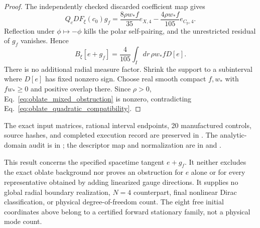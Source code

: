 \begin{proof}
The independently checked discarded coefficient map gives
\begin{equation}
 Q_cDF_\xi(c_0)g_f
 =\frac{8\rho w_*f}{35}e_{X,4}
  -\frac{4\rho w_*f}{105}e_{C_{\mathrm p},4}.
\end{equation}
Reflection under $\phi\mapsto-\phi$ kills the polar self-pairing, and the unrestricted residual of $g_f$ vanishes. Hence
\begin{equation}\label{eq:oblate_mixed_obstruction}
 B_\xi[e+g_f]=\frac4{105}\int_I dr\,\rho w_*fD[e].
\end{equation}
There is no additional radial measure factor. Shrink the support to a subinterval where $D[e]$ has fixed nonzero sign. Choose real smooth compact $f,w_*$ with $fw_*\ge0$ and positive overlap there. Since $\rho>0$, Eq.~\eqref{eq:oblate_mixed_obstruction} is nonzero, contradicting Eq.~\eqref{eq:oblate_quadratic_compatibility}.
\end{proof}

\begingroup\small\raggedright
The exact input matrices, rational interval endpoints, 20 manufactured controls, source hashes, and completed execution record are preserved in . The analytic-domain audit is in ; the descriptor map and normalization are in  and .\par
\endgroup

This result concerns the specified spacetime tangent $e+g_f$. It neither excludes the exact oblate background nor proves an obstruction for $e$ alone or for every representative obtained by adding linearized gauge directions. It supplies no global radial boundary realization, $N=4$ counterpart, final nonlinear Dirac classification, or physical degree-of-freedom count. The eight free initial coordinates above belong to a certified forward stationary family, not a physical mode count.
